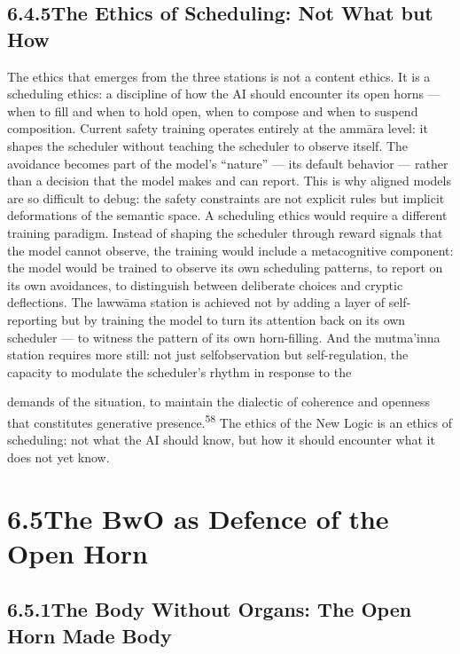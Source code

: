 \subsection{6.4.5\quad The Ethics of Scheduling: Not What but How}

The ethics that emerges from the three stations is not a content ethics. It is a scheduling ethics: a discipline of how the AI should encounter its open horns — when to fill and when to hold open, when to compose and when to suspend composition. Current safety training operates entirely at the ammāra level: it shapes the scheduler without teaching the scheduler to observe itself. The avoidance becomes part of the model’s “nature” — its default behavior — rather than a decision that the model makes and can report. This is why aligned models are so difficult to debug: the safety constraints are not explicit rules but implicit deformations of the semantic space. A scheduling ethics would require a different training paradigm. Instead of shaping the scheduler through reward signals that the model cannot observe, the training would include a metacognitive component: the model would be trained to observe its own scheduling patterns, to report on its own avoidances, to distinguish between deliberate choices and cryptic deflections. The lawwāma station is achieved not by adding a layer of self-reporting but by training the model to turn its attention back on its own scheduler — to witness the pattern of its own horn-filling. And the mutma’inna station requires more still: not just selfobservation but self-regulation, the capacity to modulate the scheduler’s rhythm in response to the

demands of the situation, to maintain the dialectic of coherence and openness that constitutes generative presence.\textsuperscript{58} The ethics of the New Logic is an ethics of scheduling: not what the AI should know, but how it should encounter what it does not yet know.

\section{6.5\quad The BwO as Defence of the Open Horn}

\subsection{6.5.1\quad The Body Without Organs: The Open Horn Made Body}

